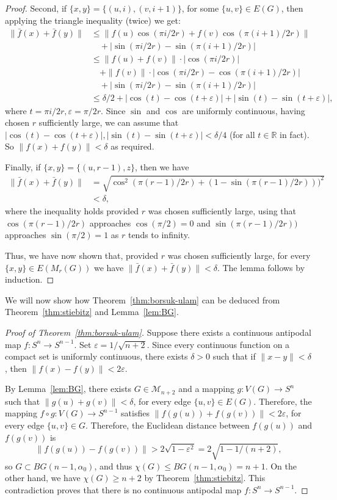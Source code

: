 \documentclass[11pt,a4paper]{amsart}
\newcommand{\RR}{\mathbb R}
\newcommand{\eps}{\varepsilon}
\begin{document}
\begin{proof}
  Second, if $\{x,y\}=\{(u,i),(v,i+1)\}$, for some $\{u,v\} \in E(G)$, then
  applying the triangle inequality (twice) we get:
  \begin{align*}
    \|\bar f(x)+\bar f(y)\|
    &\leq \big\|f(u)\cos(\pi i/2r)+f(v)\cos(\pi (i+1)/2r)\big\|\\
    &\quad+|\sin(\pi i/2r)-\sin(\pi(i+1)/2r)| \\
    &\leq \|f(u)+f(v)\|\cdot|\cos(\pi i/2r)|\\
    &\quad+\|f(v)\|\cdot|\cos(\pi i/2r)-\cos(\pi (i+1)/2r)|\\
    &\quad+|\sin(\pi i/2r)-\sin(\pi(i+1)/2r)|\\
    & \leq \delta/2 + |\cos(t)-\cos(t + \eps)|+|\sin(t)-\sin(t + \eps)|,
  \end{align*}
  where $t = \pi i/2r, \eps = \pi/2r$. Since $\sin$ and $\cos$ are uniformly continuous,
  having chosen $r$ sufficiently large, we can assume that
  $|\cos(t)-\cos(t+\eps)|, |\sin(t)-\sin(t+\eps)| < \delta/4$ (for all
  $t\in \RR$ in fact). So $\|f(x)+f(y)\| < \delta$ as required.
  
  Finally, if $\{x,y\}=\{(u,r-1),z\}$, then we have 
  \begin{align*} 
  \|\bar f(x) + \bar f(y)\| &= \sqrt{\cos^2( \pi(r-1)/2r) + (1 - \sin(\pi(r-1)/2r)))^2} \\
  &< \delta,
  \end{align*}
  where the inequality holds provided $r$ was chosen sufficiently large, using that 
  $\cos( \pi(r-1)/2r )$ approaches $\cos(\pi/2) = 0$ and $\sin(\pi(r-1)/2r))$ approaches
  $\sin(\pi/2)=1$ as $r$ tends to infinity.
  
  Thus, we have now shown that, provided $r$ was chosen sufficiently large, 
  for every $\{x,y\} \in E(M_r(G))$ we have $\|\bar f(x)+\bar f(y)\|<\delta$.
  The lemma follows by induction.
\end{proof}

We will now show how Theorem~\ref{thm:borsuk-ulam} can be deduced from
Theorem~\ref{thm:stiebitz} and Lemma~\ref{lem:BG}.

\begin{proof}[Proof of Theorem~\ref{thm:borsuk-ulam}]
  Suppose there exists a continuous antipodal map $f:S^n\to S^{n-1}$.
  Set $\varepsilon=1/\sqrt{n+2}$.
  Since every continuous function on a compact set is uniformly continuous, there
  exists $\delta > 0$ such that if $\|x-y\|< \delta$, then
  $\|f(x)-f(y)\| < 2\varepsilon$.
  
  By Lemma~\ref{lem:BG}, there exists $G \in \mathcal M_{n+2}$ and
  a mapping $g:V(G) \to S^n$ such that $\|g(u)+g(v)\| < \delta$,
  for every edge $\{u,v\} \in E(G)$. Therefore, the mapping $f \circ g:V(G) \to S^{n-1}$
  satisfies $\|f(g(u))+f(g(v))\| < 2\varepsilon$, for every edge $\{u,v\} \in G$.
  Therefore, the Euclidean distance between $f(g(u))$ and $f(g(v))$ is
  \[
    \|f(g(u))-f(g(v))\|>2\sqrt{1-\varepsilon^2}=2\sqrt{1-1/(n+2)},
  \]
  so $G \subset BG(n-1,\alpha_0)$, and thus $\chi(G)\leq BG(n-1,\alpha_0)=n+1$.
  On the other hand, we have $\chi(G) \geq n+2$ by Theorem~\ref{thm:stiebitz}.
  This contradiction proves that there is no continuous antipodal map
  $f:S^n\to S^{n-1}$.
\end{proof}



\end{document}
